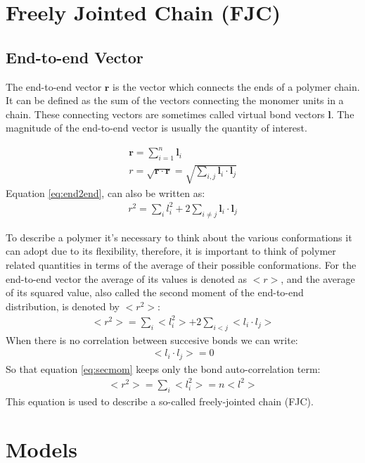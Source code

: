 \section{Freely Jointed Chain (FJC)}
\subsection{End-to-end Vector}
The end-to-end  vector $\mathbf{r}$ is  the vector which  connects the
ends of a polymer chain.  It can  be defined as the sum of the vectors
connecting the monomer units in  a chain. These connecting vectors are
sometimes called virtual bond  vectors $\mathbf{l}$.  The magnitude of
the end-to-end vector is usually the quantity of interest.

\begin{gather}
\mathbf{r} = \sum_{i=1}^{n} \mathbf{l}_{i}\\
r  =  \sqrt{\mathbf{r}
  \cdot    \mathbf{r}}    =    \sqrt{\sum_{i,j}\mathbf{l}_{i}    \cdot
  \mathbf{l}_{j}}
\end{gather}
Equation \ref{eq:end2end}, can also be written as:
\begin{gather}
r^2 = \sum_{i}l_{i}^{2} + 2 \sum_{i\neq j} \mathbf{l}_{i} \cdot \mathbf{l}_{j}
\end{gather}  

To  describe a  polymer  it's  necessary to  think  about the  various
conformations it  can adopt due  to its flexibility, therefore,  it is
important  to think  of polymer  related  quantities in  terms of  the
average of their possible conformations. For the end-to-end vector the
average of  its values  is denoted  as $<r>$, and  the average  of its
squared  value,  also  called  the  second moment  of  the  end-to-end
distribution, is denoted by $<r^2>$:
\begin{gather}
\label{eq:secmom}  
<r^2>=\sum_{i}<l_{i}^2> + 2\sum_{i<j}<l_{i} \cdot l_{j}>
\end{gather}  
When there is no correlation between succesive bonds we can write:
\begin{gather}
\label{eq:nocorr}
<l_{i} \cdot l_{j}> = 0
\end{gather}
So that equation \ref{eq:secmom} keeps only the bond auto-correlation term:
\begin{gather}
<r^2> = \sum_{i}<l_{i}^2> = n<l^2>
\end{gather}  
This equation is used to describe a so-called freely-jointed chain (FJC).

\section{Models}

